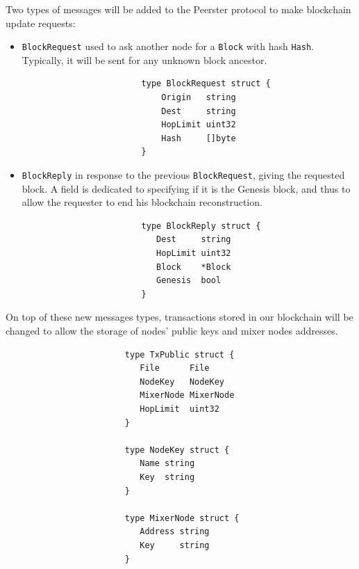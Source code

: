 \documentclass[11pt, a4paper]{article}
\begin{document}
           Two types of messages will be added to the Peerster protocol to make blockchain update requests:
           \begin{itemize}
                \item \texttt{BlockRequest} used to ask another node for a \texttt{Block} with hash \texttt{Hash}. Typically, it will be sent for any unknown block ancestor.
                    \begin{lstlisting}
                        type BlockRequest struct {
                            Origin   string
                            Dest     string
                            HopLimit uint32
                            Hash     []byte
                        }
                    \end{lstlisting}

               \item \texttt{BlockReply} in response to the previous \texttt{BlockRequest}, giving the requested block.
               A field is dedicated to specifying if it is the Genesis block, and thus to allow the requester to end his blockchain reconstruction.
                    \begin{lstlisting}
                        type BlockReply struct {
                           Dest     string
                           HopLimit uint32
                           Block    *Block
                           Genesis  bool
                        }
                    \end{lstlisting}
           \end{itemize}

            On top of these new messages types, transactions stored in our blockchain will be changed to allow the storage of nodes' public keys and mixer nodes addresses.
                \begin{lstlisting}
                        type TxPublic struct {
                           File      File
                           NodeKey   NodeKey
                           MixerNode MixerNode
                           HopLimit  uint32
                        }

                        type NodeKey struct {
                           Name string
                           Key  string
                        }

                        type MixerNode struct {
                           Address string
                           Key     string
                        }
                \end{lstlisting}
\end{document}
